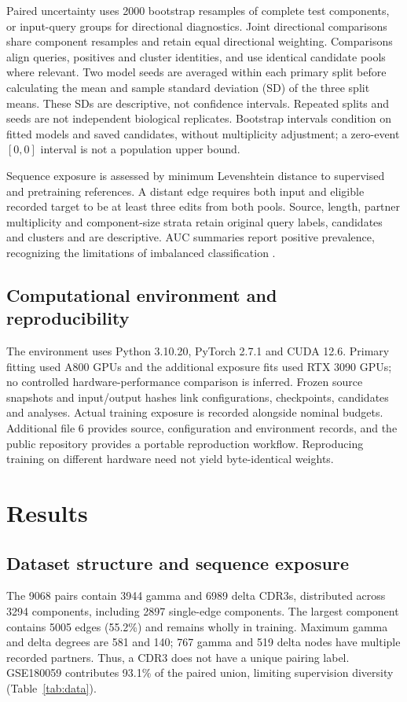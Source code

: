 \documentclass[a4paper,11pt]{article}
\begin{document}
Paired uncertainty uses 2000 bootstrap resamples of complete test components,
or input-query groups for directional diagnostics. Joint directional
comparisons share component resamples and retain equal directional weighting.
Comparisons align queries, positives and cluster identities, and use identical
candidate pools where relevant. Two model seeds are averaged within each
primary split before calculating the mean and sample standard deviation (SD)
of the three split means. These SDs are descriptive, not confidence intervals.
Repeated splits and seeds are not independent biological replicates.
Bootstrap intervals condition on fitted models and saved candidates, without
multiplicity adjustment; a zero-event $[0,0]$ interval is not a population
upper bound.

Sequence exposure is assessed by minimum Levenshtein distance to supervised
and pretraining references. A distant edge requires both input and eligible
recorded target to be at least three edits from both pools. Source, length,
partner multiplicity and component-size strata retain original query labels,
candidates and clusters and are descriptive. AUC summaries report positive
prevalence, recognizing the limitations of imbalanced classification
\cite{pr_metrics}.

\subsection{Computational environment and reproducibility}
The environment uses Python 3.10.20, PyTorch 2.7.1 and CUDA 12.6.
Primary fitting used A800 GPUs and the additional exposure fits used RTX 3090
GPUs; no controlled hardware-performance comparison is inferred.
Frozen source snapshots and input/output hashes link configurations,
checkpoints, candidates and analyses. Actual training exposure is recorded
alongside nominal budgets. Additional file 6 provides source, configuration
and environment records, and the public repository provides a portable
reproduction workflow. Reproducing training on different hardware need not
yield byte-identical weights.

\section{Results}
\subsection{Dataset structure and sequence exposure}
The 9068 pairs contain 3944 gamma and 6989 delta CDR3s, distributed across
3294 components, including 2897 single-edge components. The largest component
contains 5005 edges (55.2\%) and remains wholly in training. Maximum gamma
and delta degrees are 581 and 140; 767 gamma and 519 delta nodes have multiple
recorded partners. Thus, a CDR3 does not have a unique pairing label.
GSE180059 contributes 93.1\% of the paired union, limiting supervision diversity
(Table~\ref{tab:data}).
\end{document}
